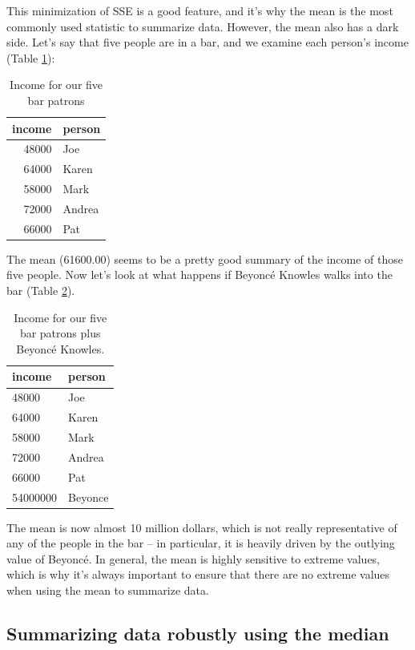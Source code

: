 \documentclass[12pt,]{book}
\theoremstyle{definition}
\theoremstyle{definition}
\theoremstyle{definition}
\theoremstyle{remark}
\begin{document}
This minimization of SSE is a good feature, and it's why the mean is the most commonly used statistic to summarize data. However, the mean also has a dark side. Let's say that five people are in a bar, and we examine each person's income (Table \ref{tab:income1}):

\begin{table}

\caption{\label{tab:income1}Income for our five bar patrons}
\centering
\begin{tabular}[t]{r|l}
\hline
income & person\\
\hline
48000 & Joe\\
\hline
64000 & Karen\\
\hline
58000 & Mark\\
\hline
72000 & Andrea\\
\hline
66000 & Pat\\
\hline
\end{tabular}
\end{table}

The mean (61600.00) seems to be a pretty good summary of the income of those five people. Now let's look at what happens if Beyoncé Knowles walks into the bar (Table \ref{tab:income2}).

\begin{table}

\caption{\label{tab:income2}Income for our five bar patrons plus Beyoncé Knowles.}
\centering
\begin{tabular}[t]{l|l}
\hline
income & person\\
\hline
48000 & Joe\\
\hline
64000 & Karen\\
\hline
58000 & Mark\\
\hline
72000 & Andrea\\
\hline
66000 & Pat\\
\hline
54000000 & Beyonce\\
\hline
\end{tabular}
\end{table}

The mean is now almost 10 million dollars, which is not really representative of any of the people in the bar -- in particular, it is heavily driven by the outlying value of Beyoncé. In general, the mean is highly sensitive to extreme values, which is why it's always important to ensure that there are no extreme values when using the mean to summarize data.

\hypertarget{summarizing-data-robustly-using-the-median}{%
\subsection{Summarizing data robustly using the median}\label{summarizing-data-robustly-using-the-median}}
\end{document}
